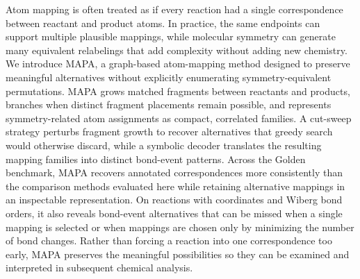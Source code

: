 Atom mapping is often treated as if every reaction had a single correspondence between reactant and product atoms. In practice, the same endpoints can support multiple plausible mappings, while molecular symmetry can generate many equivalent relabelings that add complexity without adding new chemistry. We introduce MAPA, a graph-based atom-mapping method designed to preserve meaningful alternatives without explicitly enumerating symmetry-equivalent permutations. MAPA grows matched fragments between reactants and products, branches when distinct fragment placements remain possible, and represents symmetry-related atom assignments as compact, correlated families. A cut-sweep strategy perturbs fragment growth to recover alternatives that greedy search would otherwise discard, while a symbolic decoder translates the resulting mapping families into distinct bond-event patterns. Across the Golden benchmark, MAPA recovers annotated correspondences more consistently than the comparison methods evaluated here while retaining alternative mappings in an inspectable representation. On reactions with coordinates and Wiberg bond orders, it also reveals bond-event alternatives that can be missed when a single mapping is selected or when mappings are chosen only by minimizing the number of bond changes. Rather than forcing a reaction into one correspondence too early, MAPA preserves the meaningful possibilities so they can be examined and interpreted in subsequent chemical analysis.
